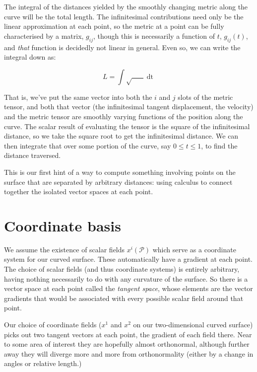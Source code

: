 The integral of the distances yielded by the smoothly changing metric along the curve will be the total length. The infinitesimal contributions need only be the linear approximation at each point, so the metric at a point can be fully characterised by a matrix, $g_{ij}$, though this is necessarily a function of $t$, $g_{ij}(t)$, and \textit{that} function is decidedly not linear in general. Even so, we can write the integral down as:

$$
L =
\int
\sqrt{
    \mathop{g_{ij}(t)}
    \mathop{v^i(t)}
    \mathop{v^j(t)}
}
\mathop{dt}
$$

That is, we've put the same vector into both the $i$ and $j$ slots of the metric tensor, and both that vector (the infinitesimal tangent displacement, the velocity) and the metric tensor are smoothly varying functions of the position along the curve. The scalar result of evaluating the tensor is the square of the infinitesimal distance, so we take the square root to get the infinitesimal distance. We can then integrate that over some portion of the curve, say $0 \le t \le 1$, to find the distance traversed.

This is our first hint of a way to compute something involving points on the surface that are separated by arbitrary distances: using calculus to connect together the isolated vector spaces at each point.

\section{Coordinate basis}

We assume the existence of scalar fields $x^i(\mathcal{P})$ which serve as a coordinate system for our curved surface. These automatically have a gradient at each point. The choice of scalar fields (and thus coordinate systems) is entirely arbitrary, having nothing necessarily to do with any curvature of the surface. So there is a vector space at each point called the \textit{tangent space}, whose elements are the vector gradients that would be associated with every possible scalar field around that point.

Our choice of coordinate fields ($x^1$ and $x^2$ on our two-dimensional curved surface) picks out two tangent vectors at each point, the gradient of each field there. Near to some area of interest they are hopefully almost orthonormal, although further away they will diverge more and more from orthonormality (either by a change in angles or relative length.)

